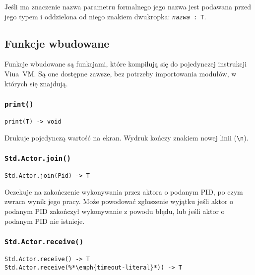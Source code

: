 Jeśli ma znaczenie nazwa parametru formalnego jego nazwa jest podawana przed
jego typem i oddzielona od niego znakiem dwukropka:
\texttt{\emph{nazwa}~:~T}.

\subsection{Funkcje wbudowane}
\label{stdlib_builtin_fns}

Funkcje wbudowane są funkcjami, które kompilują się do pojedynczej instrukcji
Viua~VM. Są one dostępne zawsze, bez potrzeby importowania modułów, w których
się znajdują.

\subsubsection{\texttt{print()}}
\label{stdlib_builtin_fns_print}

\begin{small}
\begin{lstlisting}
print(T) -> void
\end{lstlisting}
\end{small}

Drukuje pojedynczą wartość na ekran. Wydruk kończy znakiem nowej linii
(\texttt{\textbackslash{}n}).

\subsubsection{\texttt{Std.Actor.join()}}

\begin{small}
\begin{lstlisting}
Std.Actor.join(Pid) -> T
\end{lstlisting}
\end{small}

Oczekuje na zakończenie wykonywania przez aktora o podanym PID, po czym zwraca
wynik jego pracy. Może powodować zgłoszenie wyjątku jeśli aktor o podanym PID
zakończył wykonywanie z powodu błędu, lub jeśli aktor o podanym PID nie
istnieje.

\subsubsection{\texttt{Std.Actor.receive()}}

\begin{small}
\begin{lstlisting}
Std.Actor.receive() -> T
Std.Actor.receive(%*\emph{timeout-literal}*)) -> T
\end{lstlisting}
\end{small}

